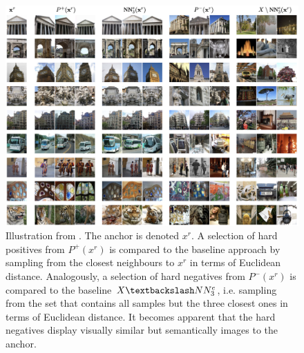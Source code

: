 \begin{figure}[h] %
    \centering
    \includegraphics[width=360pt]{images/mining_manifold_examples.png}
    \caption{Illustration from \citet{mining_manifolds_2018}.
    The anchor is denoted $x^r$.
    A selection of hard positives from $P^+(x^r)$ is compared to the 
    baseline approach by sampling from the closest neighbours to $x^r$ in 
    terms of Euclidean distance.
    Analogously, a selection of hard negatives from $P^-(x^r)$ 
    is compared to the baseline $X \textbackslash NN^e_3$, 
    i.e. sampling from the set that contains all samples but the three closest ones in 
    terms of Euclidean distance.
    It becomes apparent that the hard negatives display visually similar but 
    semantically images to the anchor. %
    }
    \label{fig:manifold_mining_examples}
\end{figure}